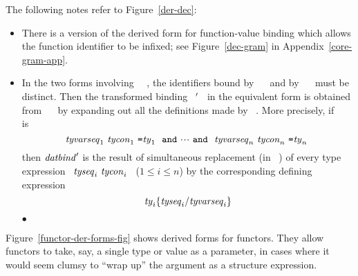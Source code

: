 The following notes refer to Figure~\ref{der-dec}:
\begin{itemize}
\item      There is a version of the derived form for function-value binding
	   which allows the function identifier to be infixed;
	   see Figure~\ref{dec-gram} in Appendix~\ref{core-gram-app}.
\item      In the two forms involving ~\WITHTYPE~, the identifiers bound
           by ~\datbind~ and by ~\typbind~ must be distinct. Then the
           transformed binding ~\datbind$\/'$~ in the equivalent form is
           obtained from ~\datbind~ by expanding out all the definitions
           made by ~\typbind.  More precisely, if ~\typbind~ is
           \[ \tyvarseq_1\ \tycon_1\ \mbox{\ml{=}} \ty_1\ \ \AND
              \ \cdots\ \AND
            \ \ \tyvarseq_n\ \tycon_n\ \mbox{\ml{=}} \ty_n\ \]
           then $\hbox{{\it datbind\/}}'$ is the result of simultaneous replacement
           (in ~\datbind) of every type expression ~${\it tyseq}_i\ {\it tycon}_i$~
           ($1\leq i\leq n$)
           by the corresponding defining expression
           \[  {\it ty}_i\{{\it tyseq}_i/{\it tyvarseq}_i\}\]
\item[\textcolor{\addcolor}{$\bullet$}]
\end{itemize}

Figure~\ref{functor-der-forms-fig} shows derived forms for functors.
They allow functors to take, say, a single type or value as a parameter,
in cases where it would seem clumsy to ``wrap up'' the argument as a
structure expression.

